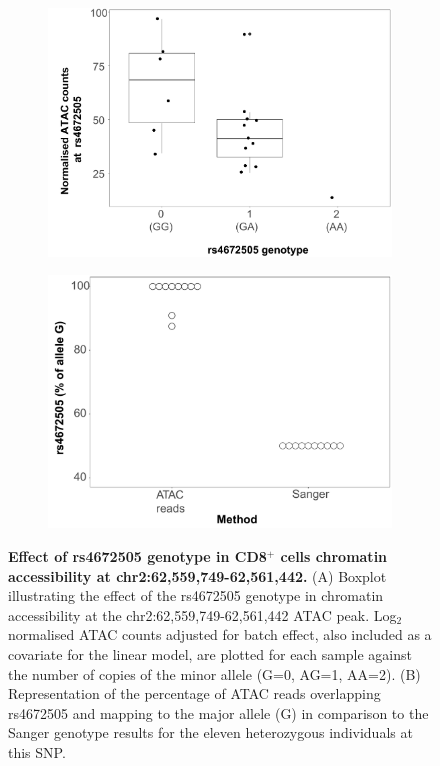 \begin{figure}[htbp]
\centering
\begin{subfigure}{0.45\textwidth}
\centering
\includegraphics[width=\textwidth]{./Results2/pdfs/ATAC_caQTL_CD8_final}
\caption{\textbf{}}
\end{subfigure}%
\begin{subfigure}{0.45\textwidth}
\centering
\includegraphics[width=\textwidth]{./Results2/pdfs/chr2p15_rs4672505_allelic_imbalance_CD8_final}
\caption{\textbf{}}
\end{subfigure}
\caption[Effect of rs4672505 genotype in CD8$^+$ cells chromatin accessibility at chr2:62,559,749-62,561,442.]{\textbf{Effect of rs4672505 genotype in CD8$^+$ cells chromatin accessibility at chr2:62,559,749-62,561,442.} (A) Boxplot illustrating the effect of the rs4672505 genotype in chromatin accessibility at the chr2:62,559,749-62,561,442 ATAC peak. Log$_2$ normalised ATAC counts adjusted for batch effect, also included as a covariate for the linear model, are plotted for each sample against the number of copies of the minor allele (G=0, AG=1, AA=2). (B) Representation of the percentage of ATAC reads overlapping rs4672505 and mapping to the major allele (G) in comparison to the Sanger genotype results for the eleven heterozygous individuals at this SNP.}
\label{figure:ATAC_PS_CTL_caQTL_and_allelic_imbalance}
\end{figure} 
 
